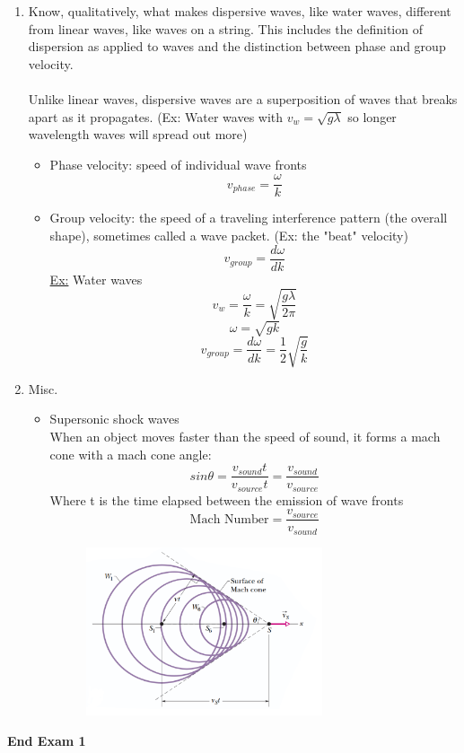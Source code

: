 \documentclass[12pt]{article}
\begin{document}
\begin{enumerate}
    \item Know, qualitatively, what makes dispersive waves, like water waves, different from linear waves, like waves on a string. This includes the definition of dispersion as applied to waves and the distinction between phase and group velocity.\\\\
    Unlike linear waves, dispersive waves are a superposition of waves that breaks apart as it propagates. (Ex: Water waves with $v_w=\sqrt{g\lambda}$ so longer wavelength waves will spread out more)
    \begin{itemize}
        \item Phase velocity: speed of individual wave fronts
        \[v_{phase}=\frac{\omega}{k}\]
        \item Group velocity: the speed of a traveling interference pattern (the overall shape), sometimes called a wave packet. (Ex: the "beat" velocity)
        \[v_{group}=\frac{d\omega}{dk}\]
        \underline{Ex:} Water waves
        \[v_w=\frac{\omega}{k}=\sqrt{\frac{g\lambda}{2\pi}}\]
        \[\omega=\sqrt{gk}\]
        \[v_{group}=\frac{d\omega}{dk}=\frac{1}{2}\sqrt{\frac{g}{k}}\]
    \end{itemize}
    \newpage
    \item Misc.
    \begin{itemize}
        \item Supersonic shock waves\\
        When an object moves faster than the speed of sound, it forms a mach cone with a mach cone angle:
        \[sin\theta =\frac{v_{sound}t}{v_{source}t}=\frac{v_{sound}}{v_{source}}\]
        Where t is the time elapsed between the emission of wave fronts
        \[\text{Mach Number}=\frac{v_{source}}{v_{sound}}\]
        \begin{figure}[H]
    \centering
    \includegraphics[width=0.7\textwidth]{mach cone.png}
        \end{figure}
    \end{itemize}
    
\end{enumerate}

\textbf{End Exam 1}
\end{document}
